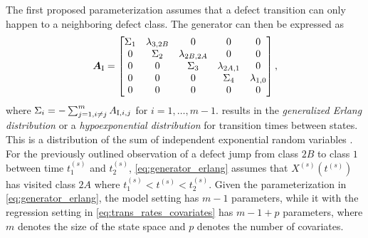 The first proposed parameterization assumes that a defect transition can only happen to a neighboring defect class. The generator can then be expressed as
\begin{align}
    \bm{A}_{\RN{1}} = \begin{bmatrix} 
    \Sigma_1 & \lambda_{3,2B} & 0 & 0 & 0 \\
    0 & \Sigma_2 & \lambda_{2B, 2A} & 0 & 0 \\
    0 & 0 & \Sigma_3 & \lambda_{2A, 1} & 0 \\
    0 & 0 & 0 & \Sigma_4 & \lambda_{1, 0} \\
    0 & 0 & 0 & 0 & 0 \\
    \end{bmatrix}, \label{eq:generator_erlang}
\end{align}
where $\Sigma_i = -\sum_{j=1, i \neq j}^m A_{\RN{1},i,j}$ for $i = 1, \dots, m-1$. 
 results in the \textit{generalized Erlang distribution} or a \textit{hypoexponential distribution} for transition times between states. This is a distribution of the sum of independent exponential random variables \citep[Section 3.1]{bladt_nielsen}. For the previously outlined observation of a defect jump from class $2B$ to class $1$ between time $t_1^{(s)}$ and $t^{(s)}_2$, \cref{eq:generator_erlang} assumes that $X^{(s)}\left(t^{(s)}\right)$ has visited class $2A$ where $t^{(s)}_1 < t^{(s)} < t^{(s)}_2$.
Given the parameterization in \cref{eq:generator_erlang}, the model setting has $m-1$ parameters, while it with the regression setting in \cref{eq:trans_rates_covariates} has $m-1 + p$ parameters, where $m$ denotes the size of the state space and $p$ denotes the number of covariates.


